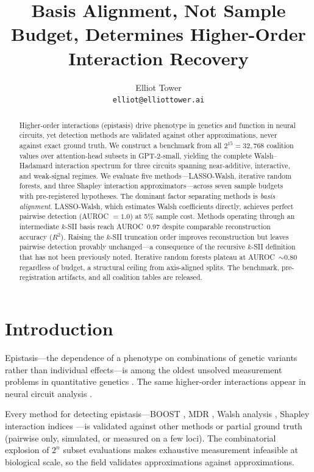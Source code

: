 \documentclass[10pt]{article}
\title{Basis Alignment, Not Sample Budget, Determines Higher-Order Interaction Recovery}
\author{
  Elliot Tower \\
  \texttt{elliot@elliottower.ai}
}
\begin{document}
\maketitle

\begin{abstract}
Higher-order interactions (epistasis) drive phenotype in genetics and
function in neural circuits, yet detection methods are validated
against other approximations, never against exact ground truth.
We construct a benchmark from all $2^{15} = 32{,}768$ coalition
values over attention-head subsets in GPT-2-small, yielding the
complete Walsh--Hadamard interaction spectrum for three circuits
spanning near-additive, interactive, and weak-signal regimes.
We evaluate five methods---LASSO-Walsh, iterative random forests,
and three Shapley interaction approximators---across seven sample
budgets with pre-registered hypotheses.
%
The dominant factor separating methods is \emph{basis alignment}.
LASSO-Walsh, which estimates Walsh coefficients directly, achieves
perfect pairwise detection (AUROC $= 1.0$) at 5\% sample cost.
Methods operating through an intermediate $k$-SII basis reach
AUROC~$0.97$ despite comparable reconstruction accuracy ($R^2$).
Raising the $k$-SII truncation order improves reconstruction but
leaves pairwise detection provably unchanged---a consequence of
the recursive $k$-SII definition that has not been previously noted.
Iterative random forests plateau at AUROC~$\sim 0.80$ regardless of
budget, a structural ceiling from axis-aligned splits.
The benchmark, pre-registration artifacts, and all coalition tables
are released.
\end{abstract}


\section{Introduction}
\label{sec:intro}

Epistasis---the dependence of a phenotype on combinations of genetic
variants rather than individual effects---is among the oldest unsolved
measurement problems in quantitative genetics
\citep{fisher1918correlation, bateson1909heredity}.
The same higher-order interactions appear in neural circuit analysis
\citep{wang2022interpretability, conmy2023automated}.

Every method for detecting epistasis---BOOST \citep{wan2010boost},
MDR \citep{ritchie2001multifactor}, Walsh analysis
\citep{neidhart2013adaptation}, Shapley interaction indices
\citep{grabisch1997korder}---is validated against other methods or
partial ground truth (pairwise only, simulated, or measured on a few
loci). The combinatorial explosion of $2^n$ subset evaluations makes
exhaustive measurement infeasible at biological scale, so the field
validates approximations against approximations.
\end{document}
